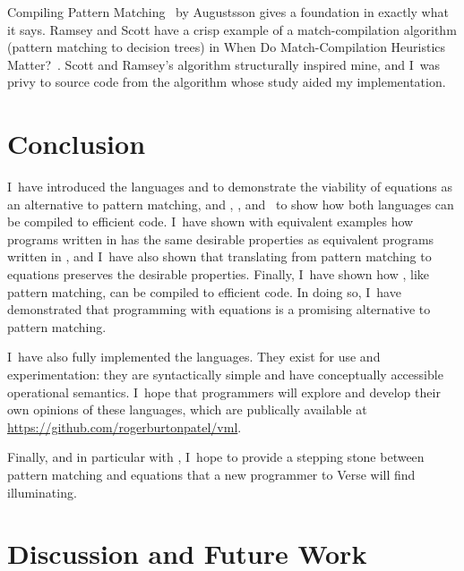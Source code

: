 \documentclass[manuscript,screen,review, 12pt, nonacm]{acmart}
\begin{document}
    Compiling Pattern Matching~\citep{augustsson1985compiling} by Augustsson
    gives a foundation in exactly what it says. Ramsey and Scott have a crisp
    example of a match-compilation algorithm (pattern matching to decision
    trees) in When Do Match-Compilation Heuristics Matter?~\citep{scottramsey}.
    Scott and Ramsey's algorithm structurally inspired mine, and I~was privy to
    source code from the algorithm whose study aided my implementation. 
    
    
    \section{Conclusion}

    I~have introduced the languages \PPlus and \VMinus to demonstrate the
    viability of equations as an alternative to pattern matching, and \D,
    \PtoVTran, and \DTran\ to show how both languages can be compiled to
    efficient code. I~have shown with equivalent examples how programs written
    in \VMinus has the same desirable properties as equivalent programs written
    in \PPlus, and I~have also shown that translating from pattern matching to
    equations preserves the desirable properties. Finally, I~have shown how
    \VMinus, like pattern matching, can be compiled to efficient code. In doing
    so, I~have demonstrated that programming with equations is a promising
    alternative to pattern matching. 

    I~have also fully implemented the languages. They exist for use and
    experimentation: they are syntactically simple and have conceptually
    accessible operational semantics. I~hope that programmers will explore and
    develop their own opinions of these languages, which are publically
    available at \url{https://github.com/rogerburtonpatel/vml}. 

    Finally, and in particular with \VMinus, I~hope to provide a stepping stone
    between pattern matching and equations that a new programmer to Verse will
    find illuminating. 
    
    
    \section{Discussion and Future Work}        
    \label{futurework}
\end{document}
